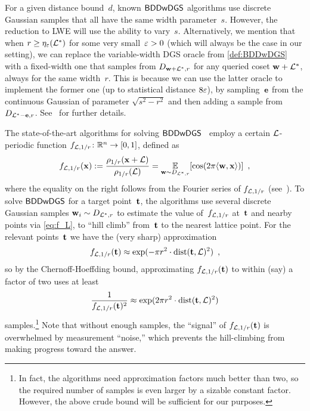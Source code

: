\begin{remark}
  \label{rem:BDDwDGS-param}
  For a given distance bound~$d$, known $\mathsf{BDDwDGS}$ algorithms use
  discrete Gaussian samples that all have the same width
  parameter~$s$. However, the reduction to LWE will use the ability to
  vary~$s$. Alternatively, we mention that when
  $r \geq \eta_{\varepsilon}(\mathcal{L}^{*})$ for some very
  small~$\varepsilon > 0$ (which will always be the case in our setting),
  we can replace the variable-width DGS oracle from
  \autoref{def:BDDwDGS} with a fixed-width one that samples from
  $D_{\mathbf{w}+\mathcal{L}^{*},r}$ for any queried coset $\mathbf{w}+\mathcal{L}^{*}$,
  always for the same width~$r$.  This is because we can use the
  latter oracle to implement the former one (up to statistical
  distance $8\varepsilon$), by sampling~$\mathbf{e}$ from the continuous
  Gaussian of parameter $\sqrt{s^{2}-r^{2}}$ and then adding a sample
  from $D_{\mathcal{L}^{*}-\mathbf{e},r}$. See~\cite[Theorem~3.1]{C:Peikert10} for
  further details.
\end{remark}

The state-of-the-art algorithms for solving
$\mathsf{BDDwDGS}$~\cite{DBLP:journals/jacm/AharonovR05,DBLP:conf/approx/LiuLM06,DBLP:conf/coco/DadushRS14}
employ a certain $\mathcal{L}$-periodic function
$f_{\mathcal{L},1/r} \colon \mathbb{R}^{n} \to [0,1]$, defined as
\begin{equation}
  \label{eq:f_L}
  f_{\mathcal{L},1/r}(\mathbf{x}) := \frac{\rho_{1/r}(\mathbf{x}+\mathcal{L})}{\rho_{1/r}(\mathcal{L})} =
  \operatorname*{\mathbb{E}}_{\mathbf{w} \sim D_{\mathcal{L}^{*},r}}[\cos(2\pi \langle\mathbf{w}, \mathbf{x}\rangle)] \enspace ,
\end{equation}
where the equality on the right follows from the Fourier series of
$f_{\mathcal{L},1/r}$ (see~\cite{DBLP:journals/jacm/AharonovR05}).  To solve
$\mathsf{BDDwDGS}$ for a target point~$\mathbf{t}$, the algorithms use several
discrete Gaussian samples $\mathbf{w}_{i} \sim D_{\mathcal{L}^{*},r}$ to estimate
the value of~$f_{\mathcal{L},1/r}$ at~$\mathbf{t}$ and nearby points via
\autoref{eq:f_L}, to ``hill climb'' from~$\mathbf{t}$ to the nearest
lattice point.  For the relevant points~$\mathbf{t}$ we have the (very
sharp) approximation
\[ f_{\mathcal{L},1/r}(\mathbf{t}) \approx \exp(-\pi r^{2} \cdot
  \operatorname{dist}(\mathbf{t},\mathcal{L})^{2}) \enspace , \] so by the Chernoff-Hoeffding
bound, approximating $f_{\mathcal{L},1/r}(\mathbf{t})$ to within (say) a factor of
two uses at least
\[ \frac{1}{f_{\mathcal{L},1/r}(\mathbf{t})^{2}} \approx \exp(2\pi r^{2} \cdot
  \operatorname{dist}(\mathbf{t},\mathcal{L})^{2}) \] samples.\footnote{In fact, the algorithms
  need approximation factors much better than two, so the required
  number of samples is even larger by a sizable constant
  factor. However, the above crude bound will be sufficient for our
  purposes.}  Note that without enough samples, the ``signal'' of
$f_{\mathcal{L},1/r}(\mathbf{t})$ is overwhelmed by measurement ``noise,'' which
prevents the hill-climbing from making progress toward the answer.

